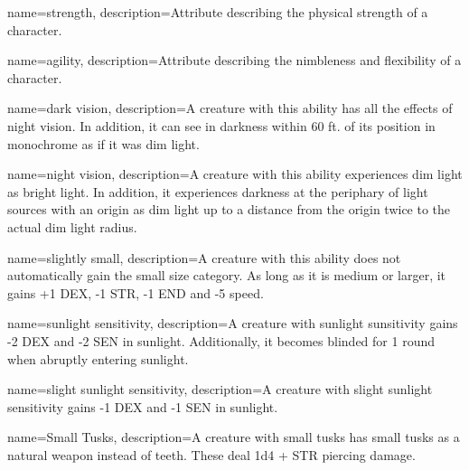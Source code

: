 {
    name=strength,
    description={Attribute describing the physical strength of a character.}
}

{
    name=agility,
    description={Attribute describing the nimbleness and flexibility of a
        character.}
}

{
    name={dark vision},
    description={A creature with this ability has all the effects of night
        vision. In addition, it can see in darkness within 60 ft. of its
        position in monochrome as if it was dim light.}
}

{
    name={night vision},
    description={A creature with this ability experiences dim light as bright
        light. In addition, it experiences darkness at the periphary of light
        sources with an origin as dim light up to a distance from the origin 
        twice to the actual dim light radius.}
}

{
    name={slightly small},
    description={A creature with this ability does not automatically gain the
        small size category. As long as it is medium or larger, it gains +1
        DEX, -1 STR, -1 END and -5 speed.}
}

{
    name={sunlight sensitivity},
    description={A creature with sunlight sunsitivity gains -2 DEX and -2 SEN
        in sunlight. Additionally, it becomes blinded for 1 round when abruptly
        entering sunlight.}
}

{
    name={slight sunlight sensitivity},
    description={A creature with slight sunlight sensitivity gains -1 DEX and
        -1 SEN in sunlight.}
}

{
    name={Small Tusks},
    description={A creature with small tusks has small tusks as a natural
        weapon instead of teeth. These deal 1d4 + STR piercing damage.}
}
